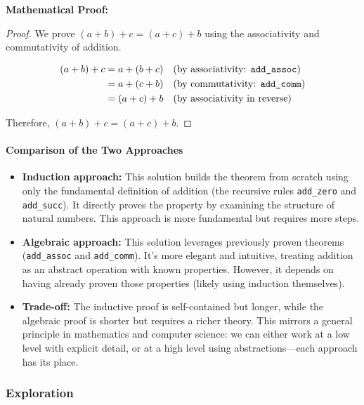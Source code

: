 \documentclass{article}
\theoremstyle{theorem}
\theoremstyle{definition}
\theoremstyle{remark}
\begin{document}
\textbf{Mathematical Proof:}
\begin{proof}
We prove $(a + b) + c = (a + c) + b$ using the associativity and commutativity of addition.

\begin{align*}
(a + b) + c &= a + (b + c) \quad \text{(by associativity: \texttt{add\_assoc})}\\
&= a + (c + b) \quad \text{(by commutativity: \texttt{add\_comm})}\\
&= (a + c) + b \quad \text{(by associativity in reverse)}
\end{align*}

Therefore, $(a + b) + c = (a + c) + b$.
\end{proof}

\paragraph{Comparison of the Two Approaches}

\begin{itemize}
\item \textbf{Induction approach:} This solution builds the theorem from scratch using only the fundamental definition of addition (the recursive rules \texttt{add\_zero} and \texttt{add\_succ}). It directly proves the property by examining the structure of natural numbers. This approach is more fundamental but requires more steps.

\item \textbf{Algebraic approach:} This solution leverages previously proven theorems (\texttt{add\_assoc} and \texttt{add\_comm}). It's more elegant and intuitive, treating addition as an abstract operation with known properties. However, it depends on having already proven those properties (likely using induction themselves).

\item \textbf{Trade-off:} The inductive proof is self-contained but longer, while the algebraic proof is shorter but requires a richer theory. This mirrors a general principle in mathematics and computer science: we can either work at a low level with explicit detail, or at a high level using abstractions—each approach has its place.
\end{itemize}

\subsubsection{Exploration}
\end{document}
